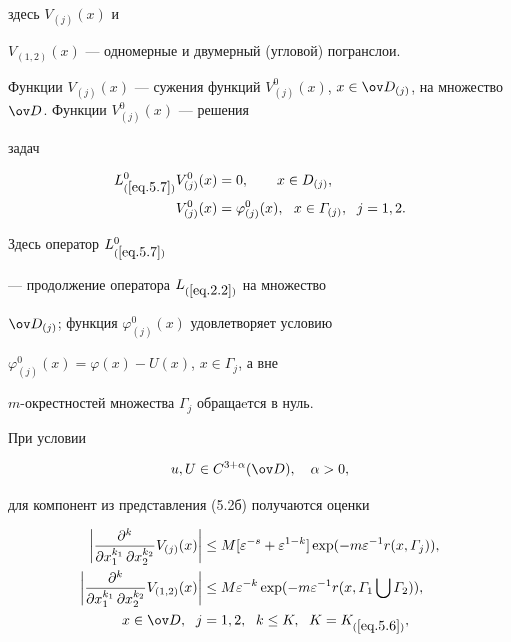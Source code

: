 здесь $V_{(j)}(x)$ и


$V_{(1,2)}(x)$ --- одномерные и двумерный (угловой) погранслои.


Функции $V_{(j)}(x)$ --- сужения функций $V^0_{(j)}(x)$, $x\in


\ov D_{(j)}$, на множество $\ov D$. Функции $V^0_{(j)}(x)$ --- решения


задач


\begin{align} \label{eq.5.7}


L^0_{(\ref{eq.5.7})} V^0_{(j)}(x)& = 0, \qquad x\in D_{(j)},\\


V^0_{(j)}(x)& = \varphi^0_{(j)}(x), \ \ x\in


\varGamma_{(j)}, \ \; j=1,2.\notag


\end{align}


Здесь оператор $L^0_{(\ref{eq.5.7})}$


--- продолжение оператора $L_{(\ref{eq.2.2})}$ на множество


$\ov D_{(j)}$; функция $\varphi^0_{(j)}(x)$ удовлетворяет условию


$\varphi^0_{(j)}(x)=\varphi(x)-U(x)$, $x\in \varGamma_j$, а вне


$m$-окрестностей множества $\varGamma_j$ обращаeтся в нуль.





При условии


$$


u, U\in C^{3+\alpha}(\ov D), \quad \alpha>0,


$$


для компонент из представления (5.2б) получаются оценки


\begin{align} \label{eq.5.8}


\bigg|\frac{\partial^{k}}{\partial x_1^{k_1}\,


\partial x_2^{k_2}}V_{(j)}(x)\bigg|


&\le M [\varepsilon^{-s}+


\varepsilon^{1-k}]\exp(-m\varepsilon^{-1} r(x,\varGamma_j)),\\


%


\bigg|\frac{\partial^{k}}{\partial x_1^{k_1}\, \partial


x_2^{k_2}}V_{(1,2)}(x)\bigg| &\le


M \varepsilon^{-k}\exp(-m \varepsilon^{-1}


r(x,\varGamma_1\bigcup \varGamma_2)), \notag\\


x\in \ov D, \ \; j&=1,2, \ \;  k\le K, \ \;


K=K_{(\ref{eq.5.6})},\notag


\end{align}


